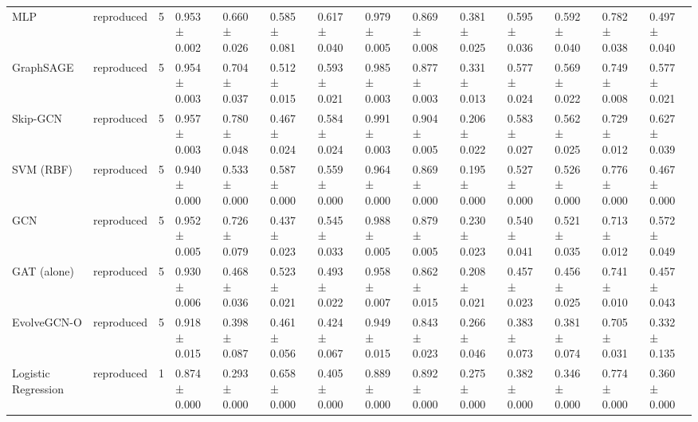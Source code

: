 \begin{table}
\begin{tabular}{llrlllllllllll}
MLP & reproduced & 5 & 0.953 ± 0.002 & 0.660 ± 0.026 & 0.585 ± 0.081 & 0.617 ± 0.040 & 0.979 ± 0.005 & 0.869 ± 0.008 & 0.381 ± 0.025 & 0.595 ± 0.036 & 0.592 ± 0.040 & 0.782 ± 0.038 & 0.497 ± 0.040 \\
GraphSAGE & reproduced & 5 & 0.954 ± 0.003 & 0.704 ± 0.037 & 0.512 ± 0.015 & 0.593 ± 0.021 & 0.985 ± 0.003 & 0.877 ± 0.003 & 0.331 ± 0.013 & 0.577 ± 0.024 & 0.569 ± 0.022 & 0.749 ± 0.008 & 0.577 ± 0.021 \\
Skip-GCN & reproduced & 5 & 0.957 ± 0.003 & 0.780 ± 0.048 & 0.467 ± 0.024 & 0.584 ± 0.024 & 0.991 ± 0.003 & 0.904 ± 0.005 & 0.206 ± 0.022 & 0.583 ± 0.027 & 0.562 ± 0.025 & 0.729 ± 0.012 & 0.627 ± 0.039 \\
SVM (RBF) & reproduced & 5 & 0.940 ± 0.000 & 0.533 ± 0.000 & 0.587 ± 0.000 & 0.559 ± 0.000 & 0.964 ± 0.000 & 0.869 ± 0.000 & 0.195 ± 0.000 & 0.527 ± 0.000 & 0.526 ± 0.000 & 0.776 ± 0.000 & 0.467 ± 0.000 \\
GCN & reproduced & 5 & 0.952 ± 0.005 & 0.726 ± 0.079 & 0.437 ± 0.023 & 0.545 ± 0.033 & 0.988 ± 0.005 & 0.879 ± 0.005 & 0.230 ± 0.023 & 0.540 ± 0.041 & 0.521 ± 0.035 & 0.713 ± 0.012 & 0.572 ± 0.049 \\
GAT (alone) & reproduced & 5 & 0.930 ± 0.006 & 0.468 ± 0.036 & 0.523 ± 0.021 & 0.493 ± 0.022 & 0.958 ± 0.007 & 0.862 ± 0.015 & 0.208 ± 0.021 & 0.457 ± 0.023 & 0.456 ± 0.025 & 0.741 ± 0.010 & 0.457 ± 0.043 \\
EvolveGCN-O & reproduced & 5 & 0.918 ± 0.015 & 0.398 ± 0.087 & 0.461 ± 0.056 & 0.424 ± 0.067 & 0.949 ± 0.015 & 0.843 ± 0.023 & 0.266 ± 0.046 & 0.383 ± 0.073 & 0.381 ± 0.074 & 0.705 ± 0.031 & 0.332 ± 0.135 \\
Logistic Regression & reproduced & 1 & 0.874 ± 0.000 & 0.293 ± 0.000 & 0.658 ± 0.000 & 0.405 ± 0.000 & 0.889 ± 0.000 & 0.892 ± 0.000 & 0.275 ± 0.000 & 0.382 ± 0.000 & 0.346 ± 0.000 & 0.774 ± 0.000 & 0.360 ± 0.000 \\
\bottomrule
\end{tabular}
\end{table}
